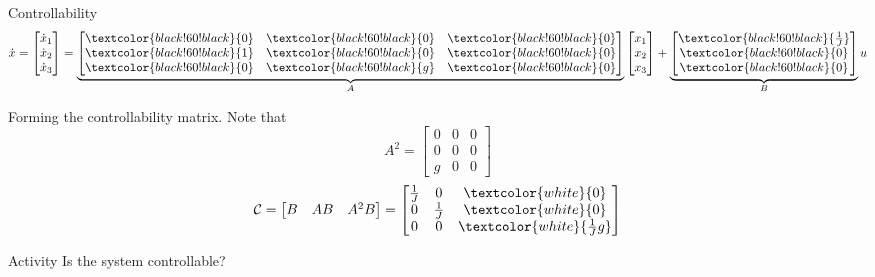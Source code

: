 \documentclass[presentation,aspectratio=169]{beamer}
\begin{document}
\begin{frame}[label={sec:orgb7c22f6}]{Controllability}
\[ \dot{x} = \begin{bmatrix} \dot{x}_1\\\dot{x}_2\\\dot{x}_3\end{bmatrix} = \underbrace{\begin{bmatrix} \textcolor{black!60!black}{0} & \textcolor{black!60!black}{0} &\textcolor{black!60!black}{0} \\\textcolor{black!60!black}{1} & \textcolor{black!60!black}{0}& \textcolor{black!60!black}{0}\\ \textcolor{black!60!black}{0}& \textcolor{black!60!black}{g} &\textcolor{black!60!black}{0} \end{bmatrix}}_{A} \begin{bmatrix} x_1\\x_2\\x_3\end{bmatrix} + \underbrace{\begin{bmatrix} \textcolor{black!60!black}{\frac{1}{J}} \\ \textcolor{black!60!black}{0} \\\textcolor{black!60!black}{0}  \end{bmatrix}}_{B} u \]

Forming the controllability matrix. Note that
\[ A^2 = \begin{bmatrix} 0 &  0 & 0\\ 0 & 0 & 0\\ g & 0 & 0 \end{bmatrix} \]
\[ \mathcal{C} = \begin{bmatrix} B & AB & A^2B\end{bmatrix}
   = \begin{bmatrix} \frac{1}{J} & 0 & \textcolor{white}{0}\\0 & \frac{1}{J} & \textcolor{white}{0} \\0 & 0 & \textcolor{white}{\frac{1}{J}g} \end{bmatrix} \]

\pause
\alert{Activity} Is the system controllable?
\end{frame}
\end{document}
